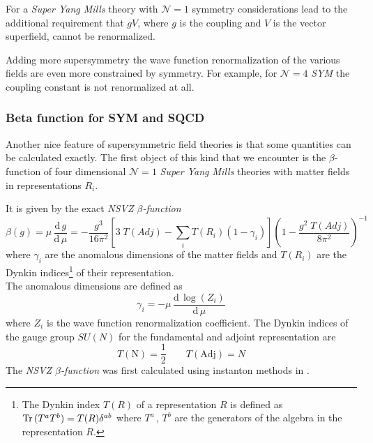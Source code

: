 For a \emph{Super Yang Mills} theory with $\mathcal{N} = 1$ symmetry considerations lead to the additional requirement that $g V$, where $g$ is the coupling and $V$ is the vector superfield, cannot be renormalized. 

Adding more supersymmetry the wave function renormalization of the various fields are even more constrained by symmetry.
For example, for $\mathcal{N}=4$ \emph{SYM} the coupling constant is not renormalized at all.

















\subsubsection{Beta function for SYM and SQCD}
Another nice feature of supersymmetric field theories is that some quantities can be calculated exactly.
The first object of this kind that we encounter is the $\beta$-function of four dimensional $\mathcal{N} =  1 $ \emph{Super Yang Mills} theories with matter fields in representations $R_i$.

It is given by the exact \emph{NSVZ $\beta$-function} 
\begin{equation}
  \beta (g) = \mu \, \frac{\mathrm{d} \, g}{\mathrm{d}\, \mu} = - \frac{g^3}{16 \pi^2} \left[ 3 \; T(Adj) - \sum_i T( R_i) ( 1 - \gamma_i ) \right]  \left( 1 - \frac{ g^2 \; T(Adj)  }{8 \pi^2} \right)^{-1}
\label{beta-exact}
\end{equation} 
where $\gamma_i$ are the anomalous dimensions of the matter fields and $T(R_i)$ are the Dynkin indices\footnote{The Dynkin index $T(R) $ of a representation $R$ is defined as $\mathrm{Tr } \,( T^a T^b) = T(R) \delta^{ab} 
$ where $T^a \, , \, T^b$ are the generators of the algebra in the representation $R$. } of their representation.\\
The anomalous dimensions are defined as
\begin{equation}
 \gamma_i = - \mu \, \frac{ \mathrm{d} \, \log(Z_i) }{\mathrm{d} \, \mu}
\end{equation}
where $Z_i$ is the wave function renormalization coefficient. The Dynkin indices of the gauge group $SU(N)$ for the fundamental and adjoint representation are 
\begin{equation}
 T(\mathrm{N}) = \frac{1}{2} \qquad T( \mathrm{Adj}) = N 
\label{eqn:suN_Dynkin_indices}
\end{equation}
The \emph{NSVZ $\beta$-function} was first calculated using instanton methods in \cite{Novikov:1985rd}.



